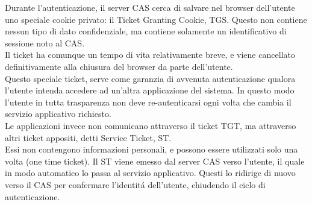 \documentclass[a4paper, 12 pt, italian]{report}
\begin{document}
Durante l'autenticazione, il server CAS cerca di salvare nel browser dell'utente uno speciale cookie privato: il Ticket Granting Cookie, TGS. Questo non contiene nessun tipo di dato confidenziale, ma contiene solamente un identificativo di sessione noto al CAS. \\
Il ticket ha comunque un tempo di vita relativamente breve, e viene cancellato definitivamente alla chiusura del browser da parte dell'utente.\\
Questo speciale ticket, serve come garanzia di avvenuta autenticazione qualora l'utente intenda accedere ad un'altra applicazione del sistema. In questo modo l'utente in tutta trasparenza non deve re-autenticarsi ogni volta che cambia il servizio applicativo richiesto.\\
Le applicazioni invece non comunicano attraverso il ticket TGT, ma attraverso
altri ticket appositi, detti Service Ticket, ST. \\
Essi non contengono informazioni personali, e possono essere utilizzati solo una volta (one time ticket). Il ST viene emesso dal server CAS verso l'utente, il quale in modo automatico lo passa al servizio applicativo. Questi lo ridirige di nuovo verso il CAS per confermare l'identit\'a dell'utente, chiudendo il ciclo di autenticazione.
\end{document}
